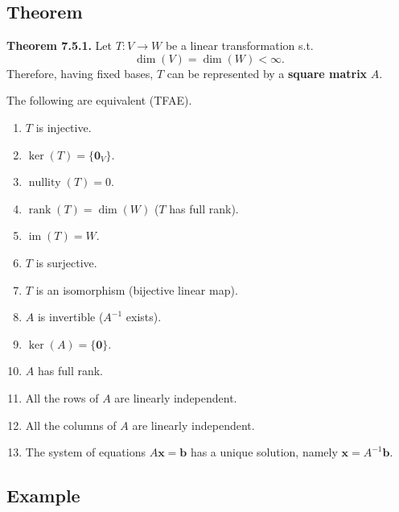 \documentclass[12pt]{article}
\begin{document}
\subsection{Theorem}

\textbf{Theorem 7.5.1.}
Let $T:V\to W$ be a linear transformation s.t.
\[
\dim(V)=\dim(W)<\infty.
\]
Therefore, having fixed bases, $T$ can be represented by a \textbf{square matrix} $A$.

The following are equivalent (TFAE).
\begin{enumerate}
    \item $T$ is injective.
    
    \item $\ker(T)=\{\mathbf{0}_V\}$.
    
    \item $\operatorname{nullity}(T)=0$.
    
    \item $\operatorname{rank}(T)=\dim(W)$
    ($T$ has full rank).
    
    \item $\operatorname{im}(T)=W$.
    
    \item $T$ is surjective.
    
    \item $T$ is an isomorphism (bijective linear map).
    
    \item $A$ is invertible ($A^{-1}$ exists).
    
    \item $\ker(A)=\{\mathbf{0}\}$.
    
    \item $A$ has full rank.
    
    \item All the rows of $A$ are linearly independent.
    
    \item All the columns of $A$ are linearly independent.
    
    \item The system of equations $A\mathbf{x}=\mathbf{b}$
    has a unique solution, namely $\mathbf{x}=A^{-1}\mathbf{b}$.
\end{enumerate}

\newpage

\subsection{Example}
\end{document}
